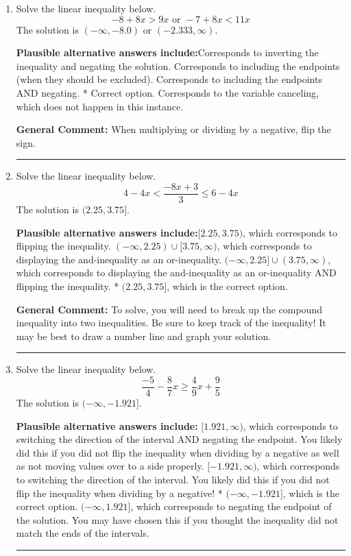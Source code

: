 \documentclass{extbook}[14pt]
\newcommand{\litem}[1]{\item #1

\rule{\textwidth}{0.4pt}}
\begin{document}
\begin{enumerate}
{\textbf{General Comment:} Remember that less/greater than or equal to includes the endpoint, while less/greater do not. Also, remember that you need to flip the inequality when you multiply or divide by a negative.
}
\litem{
Solve the linear inequality below.
\[ -8 + 8 x > 9 x \text{ or } -7 + 8 x < 11 x \]The solution is \( (-\infty, -8.0) \text{ or } (-2.333, \infty) \).\begin{enumerate}[label=\Alph*.]
\textbf{Plausible alternative answers include:}Corresponds to inverting the inequality and negating the solution.
Corresponds to including the endpoints (when they should be excluded).
Corresponds to including the endpoints AND negating.
 * Correct option.
Corresponds to the variable canceling, which does not happen in this instance.
\end{enumerate}

\textbf{General Comment:} When multiplying or dividing by a negative, flip the sign.
}
\litem{
Solve the linear inequality below.
\[ 4 - 4 x < \frac{-8 x + 3}{3} \leq 6 - 4 x \]The solution is \( (2.25, 3.75] \).\begin{enumerate}[label=\Alph*.]
\textbf{Plausible alternative answers include:}$[2.25, 3.75)$, which corresponds to flipping the inequality.
$(-\infty, 2.25) \cup [3.75, \infty)$, which corresponds to displaying the and-inequality as an or-inequality.
$(-\infty, 2.25] \cup (3.75, \infty)$, which corresponds to displaying the and-inequality as an or-inequality AND flipping the inequality.
* $(2.25, 3.75]$, which is the correct option.

\end{enumerate}

\textbf{General Comment:} To solve, you will need to break up the compound inequality into two inequalities. Be sure to keep track of the inequality! It may be best to draw a number line and graph your solution.
}
\litem{
Solve the linear inequality below.
\[ \frac{-5}{4} - \frac{8}{7} x \geq \frac{4}{9} x + \frac{9}{5} \]The solution is \( (-\infty, -1.921] \).\begin{enumerate}[label=\Alph*.]
\textbf{Plausible alternative answers include:} $[1.921, \infty)$, which corresponds to switching the direction of the interval AND negating the endpoint. You likely did this if you did not flip the inequality when dividing by a negative as well as not moving values over to a side properly.
 $[-1.921, \infty)$, which corresponds to switching the direction of the interval. You likely did this if you did not flip the inequality when dividing by a negative!
* $(-\infty, -1.921]$, which is the correct option.
 $(-\infty, 1.921]$, which corresponds to negating the endpoint of the solution.
You may have chosen this if you thought the inequality did not match the ends of the intervals.
\end{enumerate}

}
\end{enumerate}
\end{document}
